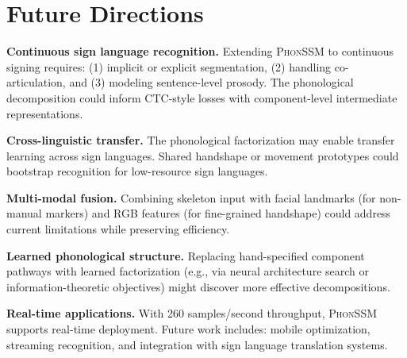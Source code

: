 \documentclass{article}
\theoremstyle{definition}
\theoremstyle{remark}
\newcommand{\phonssm}{\textsc{PhonSSM}}
\begin{document}
\section{Future Directions}
\label{app:future}

\textbf{Continuous sign language recognition.} Extending \phonssm{} to continuous signing requires: (1) implicit or explicit segmentation, (2) handling co-articulation, and (3) modeling sentence-level prosody. The phonological decomposition could inform CTC-style losses with component-level intermediate representations.

\textbf{Cross-linguistic transfer.} The phonological factorization may enable transfer learning across sign languages. Shared handshape or movement prototypes could bootstrap recognition for low-resource sign languages.

\textbf{Multi-modal fusion.} Combining skeleton input with facial landmarks (for non-manual markers) and RGB features (for fine-grained handshape) could address current limitations while preserving efficiency.

\textbf{Learned phonological structure.} Replacing hand-specified component pathways with learned factorization (e.g., via neural architecture search or information-theoretic objectives) might discover more effective decompositions.

\textbf{Real-time applications.} With 260 samples/second throughput, \phonssm{} supports real-time deployment. Future work includes: mobile optimization, streaming recognition, and integration with sign language translation systems.
\end{document}
